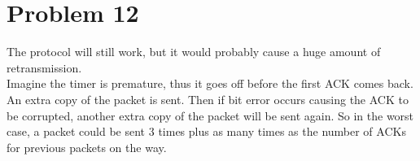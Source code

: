 \documentclass[titlepage, paper=a4, fontsize=11pt]{scrartcl} %
\numberwithin{equation}{section} %
\numberwithin{table}{section} %
\begin{document}
\newpage


\section*{Problem 12}
The protocol will still work, but it would probably cause a huge amount of retransmission. \\
Imagine the timer is premature, thus it goes off before the first ACK comes back. An extra copy of
the packet is sent. Then if bit error occurs causing the ACK to be corrupted, another extra copy of the packet will be sent again. So in the worst case, a packet could be sent 3 times plus as many times as the number of ACKs for previous packets on the way.
\\


\end{document}
